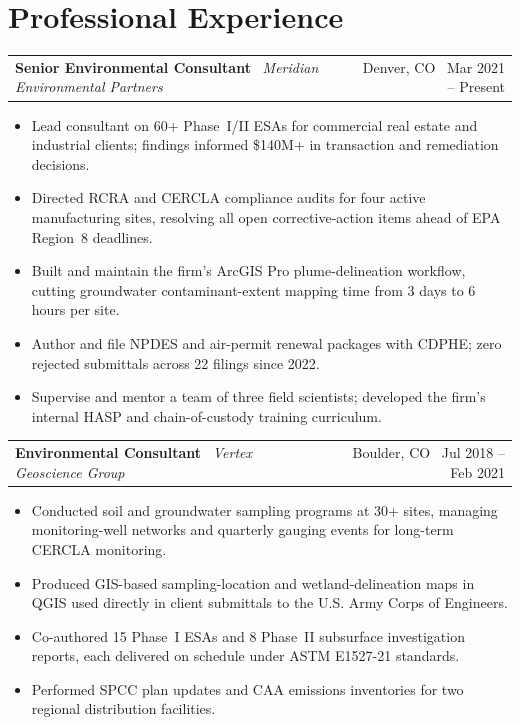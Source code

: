 \documentclass[10pt,letterpaper]{article}
\makeatletter
\newcommand{\role}[3]{%
  \begin{tabularx}{\linewidth}{@{}X r@{}}
    \textbf{\color{slate}#1} \textbar\ \textit{\color{stone}#2} & {\small\color{stone}#3} \\
  \end{tabularx}%
  \vspace{-4pt}
}
\makeatother
\begin{document}
\section{Professional Experience}
\small

\role{Senior Environmental Consultant}{Meridian Environmental Partners}{Denver, CO \textbar\ Mar 2021 -- Present}
\begin{itemize}
  \item Lead consultant on 60+ Phase~I/II ESAs for commercial real estate and industrial
        clients; findings informed \$140M+ in transaction and remediation decisions.
  \item Directed RCRA and CERCLA compliance audits for four active manufacturing sites,
        resolving all open corrective-action items ahead of EPA Region~8 deadlines.
  \item Built and maintain the firm's ArcGIS Pro plume-delineation workflow, cutting
        groundwater contaminant-extent mapping time from 3 days to 6 hours per site.
  \item Author and file NPDES and air-permit renewal packages with CDPHE; zero rejected
        submittals across 22 filings since 2022.
  \item Supervise and mentor a team of three field scientists; developed the firm's internal
        HASP and chain-of-custody training curriculum.
\end{itemize}

\role{Environmental Consultant}{Vertex Geoscience Group}{Boulder, CO \textbar\ Jul 2018 -- Feb 2021}
\begin{itemize}
  \item Conducted soil and groundwater sampling programs at 30+ sites, managing
        monitoring-well networks and quarterly gauging events for long-term CERCLA monitoring.
  \item Produced GIS-based sampling-location and wetland-delineation maps in QGIS used
        directly in client submittals to the U.S. Army Corps of Engineers.
  \item Co-authored 15 Phase~I ESAs and 8 Phase~II subsurface investigation reports,
        each delivered on schedule under ASTM E1527-21 standards.
  \item Performed SPCC plan updates and CAA emissions inventories for two regional
        distribution facilities.
\end{itemize}
\end{document}
